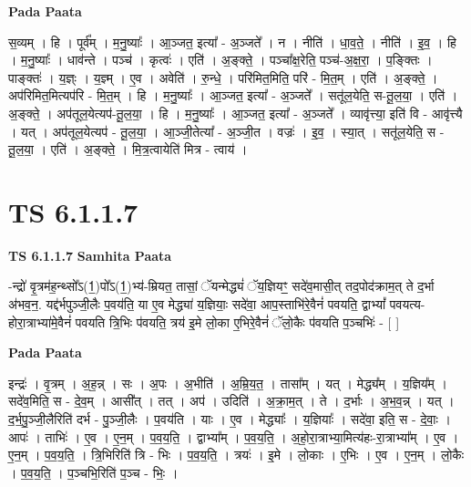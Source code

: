\documentclass[17pt]{extarticle}
\begin{document}
\textbf{Pada Paata} \newline

स॒व्यम् । हि । पूर्व᳚म् । म॒नु॒ष्याः᳚ । आ॒ञ्जत॒ इत्या᳚ - अ॒ञ्जते᳚ । न । नीति॑ । धा॒व॒ते॒ । नीति॑ । इ॒व॒ । हि । म॒नु॒ष्याः᳚ । धाव॑न्ते । पञ्च॑ । कृत्वः॑ । एति॑ । अ॒ङ्क्ते॒ । पञ्चा᳚क्ष॒रेति॒ पञ्च॑-अ॒क्ष॒रा॒ । प॒ङ्क्तिः । पाङ्क्तः॑ । य॒ज्ञ्ः । य॒ज्ञ्म् । ए॒व । अवेति॑ । रु॒न्धे॒ । परि॑मित॒मिति॒ परि॑ - मि॒त॒म् । एति॑ । अ॒ङ्क्ते॒ । अप॑रिमित॒मित्यप॑रि - मि॒त॒म् । हि । म॒नु॒ष्याः᳚ । आ॒ञ्जत॒ इत्या᳚ - अ॒ञ्जते᳚ । सतू॑ल॒येति॒ स-तू॒ल॒या॒ । एति॑ । अ॒ङ्क्ते॒ । अप॑तूल॒येत्यप॑-तू॒ल॒या॒ । हि । म॒नु॒ष्याः᳚ । आ॒ञ्जत॒ इत्या᳚ - अ॒ञ्जते᳚ । व्यावृ॑त्त्या॒ इति॑ वि - आवृ॑त्त्यै । यत् । अप॑तूल॒येत्यप॑ - तू॒ल॒या॒ । आ॒ञ्जी॒तेत्या᳚ - अ॒ञ्जी॒त । वज्रः॑ । इ॒व॒ । स्या॒त् । सतू॑ल॒येति॒ स - तू॒ल॒या॒ । एति॑ । अ॒ङ्क्ते॒ । मि॒त्र॒त्वायेति॑ मित्र - त्वाय॑ ।  \newline





\section{ TS 6.1.1.7 }

\textbf{TS 6.1.1.7 } \newline
\textbf{Samhita Paata} \newline

-न्द्रो॑ वृ॒त्रम॑ह॒न्थ्सो᳚ऽ(1॒)पो᳚ऽ(1॒)भ्य॑-म्रियत॒ तासां॒ ॅयन्मेद्ध्यं॑ ॅय॒ज्ञियꣳ॒॒ सदे॑व॒मासी॒त् तद॒पोद॑क्राम॒त् ते द॒र्भा अ॑भव॒न॒. यद्द॑र्भपुञ्जी॒लैः प॒वय॑ति॒ या ए॒व मेद्ध्या॑ य॒ज्ञियाः॒ सदे॑वा॒ आप॒स्ताभि॑रे॒वैनं॑ पवयति॒ द्वाभ्यां᳚ पवयत्य-होरा॒त्राभ्या॑मे॒वैनं॑ पवयति त्रि॒भिः प॑वयति॒ त्रय॑ इ॒मे लो॒का ए॒भिरे॒वैनं॑ ॅलो॒कैः प॑वयति प॒ञ्चभिः॑ - [  ] \newline

\textbf{Pada Paata} \newline

इन्द्रः॑ । वृ॒त्रम् । अ॒ह॒न्न् । सः । अ॒पः । अ॒भीति॑ । अ॒म्रि॒य॒त॒ । तासा᳚म् । यत् । मेद्ध्य᳚म् । य॒ज्ञिय᳚म् । सदे॑व॒मिति॒ स - दे॒व॒म् । आसी᳚त् । तत् । अप॑ । उदिति॑ । अ॒क्रा॒म॒त् । ते । द॒र्भाः । अ॒भ॒व॒न्न् । यत् । द॒र्भ॒पु॒ञ्जी॒लैरिति॑ दर्भ - पु॒ञ्जी॒लैः । प॒वय॑ति । याः । ए॒व । मेद्ध्याः᳚ । य॒ज्ञियाः᳚ । सदे॑वा॒ इति॒ स - दे॒वाः॒ । आपः॑ । ताभिः॑ । ए॒व । ए॒न॒म् । प॒व॒य॒ति॒ । द्वाभ्या᳚म् । प॒व॒य॒ति॒ । अ॒हो॒रा॒त्राभ्या॒मित्य॑हः-रा॒त्राभ्या᳚म् । ए॒व । ए॒न॒म् । प॒व॒य॒ति॒ । त्रि॒भिरिति॑ त्रि - भिः । प॒व॒य॒ति॒ । त्रयः॑ । इ॒मे । लो॒काः । ए॒भिः । ए॒व । ए॒न॒म् । लो॒कैः । प॒व॒य॒ति॒ । प॒ञ्चभि॒रिति॑ प॒ञ्च - भिः॒ ।  \newline
\end{document}
